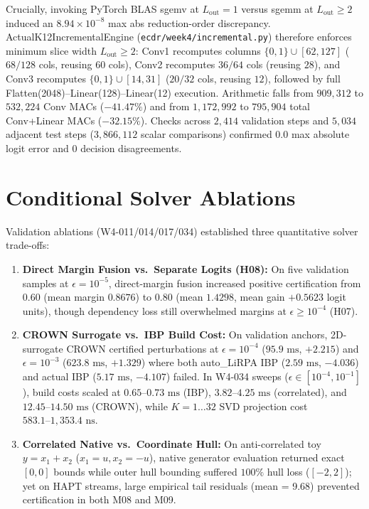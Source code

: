 \documentclass[11pt,oneside,a4paper]{report}
\newcommand{\code}[1]{{\small\upshape\ttfamily #1}}
\theoremstyle{remark}
\begin{document}
Crucially, invoking PyTorch BLAS \code{sgemv} at $L_{\text{out}}=1$ versus \code{sgemm} at $L_{\text{out}} \ge 2$ induced an $8.94 \times 10^{-8}$ max abs reduction-order discrepancy. \code{ActualK12IncrementalEngine} (\nolinkurl{ecdr/week4/incremental.py}) therefore enforces minimum slice width $L_{\text{out}} \ge 2$: \code{Conv1} recomputes columns $\{0,1\} \cup [62,127]$ ($68/128$ cols, reusing $60$ cols), \code{Conv2} recomputes $36/64$ cols (reusing $28$), and \code{Conv3} recomputes $\{0,1\} \cup [14,31]$ ($20/32$ cols, reusing $12$), followed by full \code{Flatten(2048)}--\code{Linear(128)}--\code{Linear(12)} execution. Arithmetic falls from $909{,}312$ to $532{,}224$ Conv MACs ($-41.47\%$) and from $1{,}172{,}992$ to $795{,}904$ total Conv+Linear MACs ($-32.15\%$). Checks across $2{,}414$ validation steps and $5{,}034$ adjacent test steps ($3{,}866{,}112$ scalar comparisons) confirmed $0.0$ max absolute logit error and $0$ decision disagreements.

\section{Conditional Solver Ablations}
Validation ablations (\code{W4-011/014/017/034}) established three quantitative solver trade-offs:
\begin{enumerate}[leftmargin=1.5em]
  \item \textbf{Direct Margin Fusion vs.\ Separate Logits (\code{H08}):} On five validation samples at $\epsilon = 10^{-5}$, direct-margin fusion increased positive certification from $0.60$ (mean margin $0.8676$) to $0.80$ (mean $1.4298$, mean gain $+0.5623$ logit units), though dependency loss still overwhelmed margins at $\epsilon \ge 10^{-4}$ (\code{H07}).
  \item \textbf{CROWN Surrogate vs.\ IBP Build Cost:} On validation anchors, 2D-surrogate \code{CROWN} certified perturbations at $\epsilon = 10^{-4}$ ($95.9\text{ ms}$, $+2.215$) and $\epsilon = 10^{-3}$ ($623.8\text{ ms}$, $+1.329$) where both \code{auto\_LiRPA IBP} ($2.59\text{ ms}$, $-4.036$) and actual IBP ($5.17\text{ ms}$, $-4.107$) failed. In \code{W4-034} sweeps ($\epsilon \in [10^{-4}, 10^{-1}]$), build costs scaled at $0.65\text{--}0.73\text{ ms}$ (IBP), $3.82\text{--}4.25\text{ ms}$ (correlated), and $12.45\text{--}14.50\text{ ms}$ (CROWN), while $K=1\dots 32$ SVD projection cost $583.1\text{--}1{,}353.4\text{ ns}$.
  \item \textbf{Correlated Native vs.\ Coordinate Hull:} On anti-correlated toy $y = x_1 + x_2$ ($x_1=u, x_2=-u$), native generator evaluation returned exact $[0,0]$ bounds while outer hull bounding suffered $100\%$ hull loss ($[-2,2]$); yet on HAPT streams, large empirical tail residuals (\code{mean = 9.68}) prevented certification in both \code{M08} and \code{M09}.
\end{enumerate}
\end{document}
